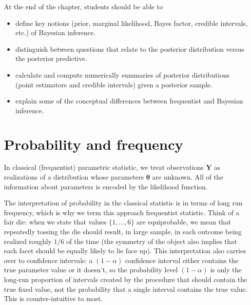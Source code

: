\documentclass[
  11pt,
  letterpaper,
]{scrbook}
\providecommand{\tightlist}{%
  \setlength{\itemsep}{0pt}\setlength{\parskip}{0pt}}
\theoremstyle{definition}
\theoremstyle{plain}
\theoremstyle{plain}
\theoremstyle{plain}
\theoremstyle{definition}
\theoremstyle{definition}
\theoremstyle{plain}
\theoremstyle{plain}
\theoremstyle{remark}
\begin{document}
\begin{tcolorbox}[enhanced jigsaw, arc=.35mm, bottomrule=.15mm, bottomtitle=1mm, breakable, colback=white, colbacktitle=quarto-callout-important-color!10!white, colframe=quarto-callout-important-color-frame, coltitle=black, left=2mm, leftrule=.75mm, opacityback=0, opacitybacktitle=0.6, rightrule=.15mm, title=\textcolor{quarto-callout-important-color}{\faExclamation}\hspace{0.5em}{\textbf{Learning objectives}:}, titlerule=0mm, toprule=.15mm, toptitle=1mm]

At the end of the chapter, students should be able to

\begin{itemize}
\tightlist
\item
  define key notions (prior, marginal likelihood, Bayes factor, credible
  intervals, etc.) of Bayesian inference.
\item
  distinguish between questions that relate to the posterior
  distribution versus the posterior predictive.
\item
  calculate and compute numerically summaries of posterior distributions
  (point estimators and credible intervals) given a posterior sample.
\item
  explain some of the conceptual differences between frequentist and
  Bayesian inference.
\end{itemize}

\end{tcolorbox}

\section{Probability and frequency}\label{probability-and-frequency}

In classical (frequentist) parametric statistic, we treat observations
\(\boldsymbol{Y}\) as realizations of a distribution whose parameters
\(\boldsymbol{\theta}\) are unknown. All of the information about
parameters is encoded by the likelihood function.

The interpretation of probability in the classical statistic is in terms
of long run frequency, which is why we term this approach frequentist
statistic. Think of a fair die: when we state that values
\(\{1, \ldots, 6\}\) are equiprobable, we mean that repeatedly tossing
the die should result, in large sample, in each outcome being realized
roughly \(1/6\) of the time (the symmetry of the object also implies
that each facet should be equally likely to lie face up). This
interpretation also carries over to confidence intervals: a
\((1-\alpha)\) confidence interval either contains the true parameter
value or it doesn't, so the probability level \((1-\alpha)\) is only the
long-run proportion of intervals created by the procedure that should
contain the true fixed value, not the probability that a single interval
contains the true value. This is counter-intuitive to most.
\end{document}
